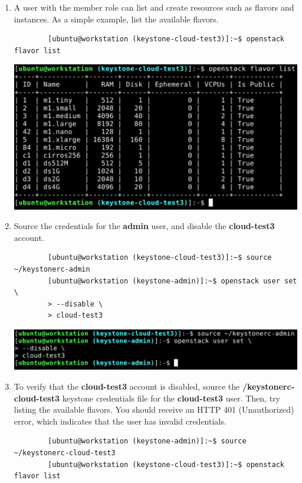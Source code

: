 \documentclass[letterpaper, 12pt]{article}
\begin{document}
\begin{enumerate}
    \item A user with the member role can list and create resources such as flavors and instances.
    As a simple example, list the available flavors.
    \begin{lstlisting}
        [ubuntu@workstation (keystone-cloud-test3)]:~$ openstack flavor list
    \end{lstlisting}

    \begin{center}
        \includegraphics[width=\linewidth]{images/part4/step14.png}
    \end{center}

    \item Source the credentials for the \textbf{admin} user, and disable the \textbf{cloud-test3} account.
    \begin{lstlisting}
        [ubuntu@workstation (keystone-cloud-test3)]:~$ source ~/keystonerc-admin
        [ubuntu@workstation (keystone-admin)]:~$ openstack user set \
        > --disable \
        > cloud-test3
    \end{lstlisting}

    \begin{center}
        \includegraphics[width=\linewidth]{images/part4/step15.png}
    \end{center}

    \item To verify that the \textbf{cloud-test3} account is disabled, source the
    \textbf{\texttildemid/keystonerc-cloud-test3} keystone credentials file for the \textbf{cloud-test3} user.
    Then, try listing the available flavors.
    You should receive an HTTP 401 (Unauthorized) error, which indicates that the user has invalid credentials.
    \begin{lstlisting}
        [ubuntu@workstation (keystone-admin)]:~$ source ~/keystonerc-cloud-test3
        [ubuntu@workstation (keystone-cloud-test3)]:~$ openstack flavor list
    \end{lstlisting}


\end{enumerate}
\end{document}
